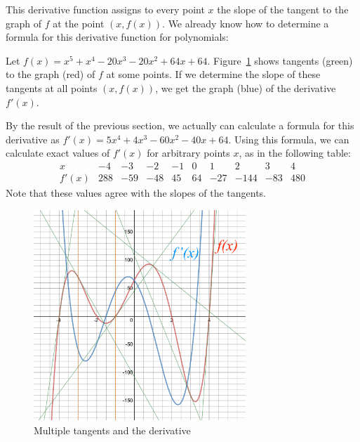 This derivative function assigns to every point $x$ the slope of the tangent
to the graph of $f$ at the point $(x,f(x))$.
We already know how to determine a formula for this derivative function for
polynomials:
\begin{bsp}
Let $f(x)=x^{5}+x^{4}-20x^{3}-20x^{2}+64x+64$.
Figure~\ref{figmultitangent} shows tangents (green) to the graph (red) of $f$
at some points. If we determine the slope of these tangents at all points
$(x,f(x))$, we get the graph (blue) of the derivative $f'(x)$.

By the result of the previous section, we actually can calculate a formula
for this derivative as $f'(x)=5x^{4}+4x^{3}-60x^{2}-40x+64$. Using
this formula, we can calculate exact values of $f'(x)$ for arbitrary points $x$, as in the following table:
\[
\begin{array}{r|rrrrrrrrr}
x&-4&-3&-2&-1&0&1&2&3&4\\
\hline
f'(x)&288&-59&-48&45&64&-27&-144&-83&480
\end{array}
\]
Note that these values agree with the slopes of the tangents.
\end{bsp}
\begin{figure}[t]
\begin{center}
\includegraphics[width=8cm]{pic/MultiTangent.pdf}
\end{center}
\caption{Multiple tangents and the derivative}
\label{figmultitangent}
\end{figure}

